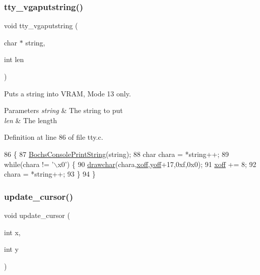 \subsubsection{\texorpdfstring{tty\+\_\+vgaputstring()}{tty\_vgaputstring()}}
{\footnotesize\ttfamily void tty\+\_\+vgaputstring (\begin{DoxyParamCaption}\item[{char $\ast$}]{string,  }\item[{int}]{len }\end{DoxyParamCaption})}



Puts a string into V\+R\+AM, Mode 13 only. 


\begin{DoxyParams}{Parameters}
{\em string} & The string to put \\
\hline
{\em len} & The length \\
\hline
\end{DoxyParams}


Definition at line 86 of file tty.\+c.


\begin{DoxyCode}
86                                              \{
87     \hyperlink{a00071_a19e1f554d03c977f8b947f21489daa41_a19e1f554d03c977f8b947f21489daa41}{BochsConsolePrintString}(\textcolor{keywordtype}{string});
88     \textcolor{keywordtype}{char} chara = *\textcolor{keywordtype}{string}++;
89     \textcolor{keywordflow}{while}(chara != \textcolor{stringliteral}{'\(\backslash\)x0'}) \{
90         \hyperlink{a00056_a2c8df7a20b47341b70d97a7ff21d86ea_a2c8df7a20b47341b70d97a7ff21d86ea}{drawchar}(chara,\hyperlink{a00167_abaa0d20f0e52ce0d3a7d706f6ac16266_abaa0d20f0e52ce0d3a7d706f6ac16266}{xoff},\hyperlink{a00167_a1a7539764d0ae8cd06ce45c62cf92bca_a1a7539764d0ae8cd06ce45c62cf92bca}{yoff}+17,0xf,0x0);
91         \hyperlink{a00167_abaa0d20f0e52ce0d3a7d706f6ac16266_abaa0d20f0e52ce0d3a7d706f6ac16266}{xoff} += 8;
92         chara = *\textcolor{keywordtype}{string}++;
93     \}
94 \}
\end{DoxyCode}
\mbox{\label{a00170_a492f5021d7340613e732ef37bbaa04e4_a492f5021d7340613e732ef37bbaa04e4}} 
\subsubsection{\texorpdfstring{update\+\_\+cursor()}{update\_cursor()}}
{\footnotesize\ttfamily void update\+\_\+cursor (\begin{DoxyParamCaption}\item[{int}]{x,  }\item[{int}]{y }\end{DoxyParamCaption})}




